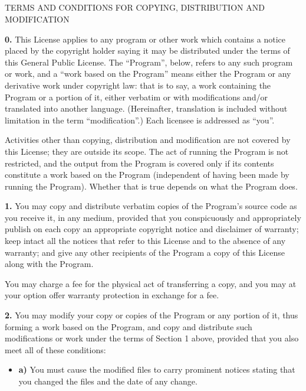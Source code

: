 {\subsection*{
}
\label{SEC3}

TERMS AND CONDITIONS FOR COPYING, DISTRIBUTION AND MODIFICATION 

{\bf 0.} This License applies to any program or other work which contains a
notice placed by the copyright holder saying it may be distributed under the
terms of this General Public License. The ``Program'', below, refers to any
such program or work, and a ``work based on the Program'' means either the
Program or any derivative work under copyright law: that is to say, a work
containing the Program or a portion of it, either verbatim or with
modifications and/or translated into another language. (Hereinafter,
translation is included without limitation in the term ``modification''.) Each
licensee is addressed as ``you''. 

Activities other than copying, distribution and modification are not covered
by this License; they are outside its scope. The act of running the Program is
not restricted, and the output from the Program is covered only if its
contents constitute a work based on the Program (independent of having been
made by running the Program). Whether that is true depends on what the Program
does. 

{\bf 1.} You may copy and distribute verbatim copies of the Program's source
code as you receive it, in any medium, provided that you conspicuously and
appropriately publish on each copy an appropriate copyright notice and
disclaimer of warranty; keep intact all the notices that refer to this License
and to the absence of any warranty; and give any other recipients of the
Program a copy of this License along with the Program. 

You may charge a fee for the physical act of transferring a copy, and you may
at your option offer warranty protection in exchange for a fee. 

{\bf 2.} You may modify your copy or copies of the Program or any portion of
it, thus forming a work based on the Program, and copy and distribute such
modifications or work under the terms of Section 1 above, provided that you
also meet all of these conditions: 

\begin{itemize}
\item {\bf a)} You must cause the modified files to carry prominent  notices
   stating that you changed the files and the date of any change.  


\end{itemize}}
